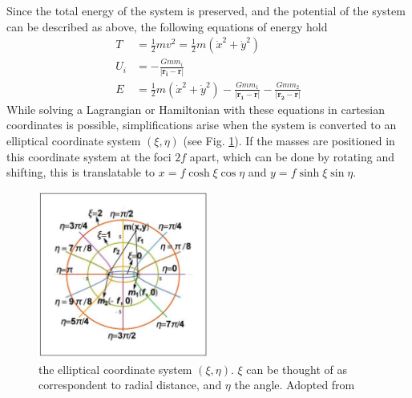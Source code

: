 \documentclass[preprint,titlepage,preprintnumbers,amsmath,amssymb,aps,11pt]{revtex4-2}
\begin{document}
Since the total energy of the system is preserved, and the potential of the system can be described as above, the following equations of energy hold
\begin{equation}
    \begin{aligned}
        T   & =\frac{1}{2}mv^2=\frac{1}{2}m(\dot{x}^2 + \dot{y}^2)                                                 \\
        U_i & =-\frac{Gmm_i}{|\bm{r_i}-\bm{r}|}                                                                    \\
        E   & =\frac{1}{2}m(\dot{x}^2 + \dot{y}^2)-\frac{Gmm_1}{|\bm{r_1}-\bm{r}|}-\frac{Gmm_2}{|\bm{r_2}-\bm{r}|}
    \end{aligned}
\end{equation}
While solving a Lagrangian or Hamiltonian with these equations in cartesian coordinates is possible, simplifications arise when the system is converted to an elliptical coordinate system $(\xi,\eta)$ (see Fig. \ref{fig:coordinatesys}). If the masses are positioned in this coordinate system at the foci $2f$ apart, which can be done by rotating and shifting, this is translatable to $x=f\cosh{\xi}\cos{\eta}$ and $y=f\sinh{\xi}\sin{\eta}$.
\begin{figure}
    \centering
    \includegraphics[width=0.5\textwidth]{Fig 2.png}
    \caption{the elliptical coordinate system $(\xi,\eta)$. $\xi$ can be thought of as correspondent to radial distance, and $\eta$ the angle. Adopted from \cite{Krishnaswami2019}}
    \label{fig:coordinatesys}
\end{figure}
\end{document}
